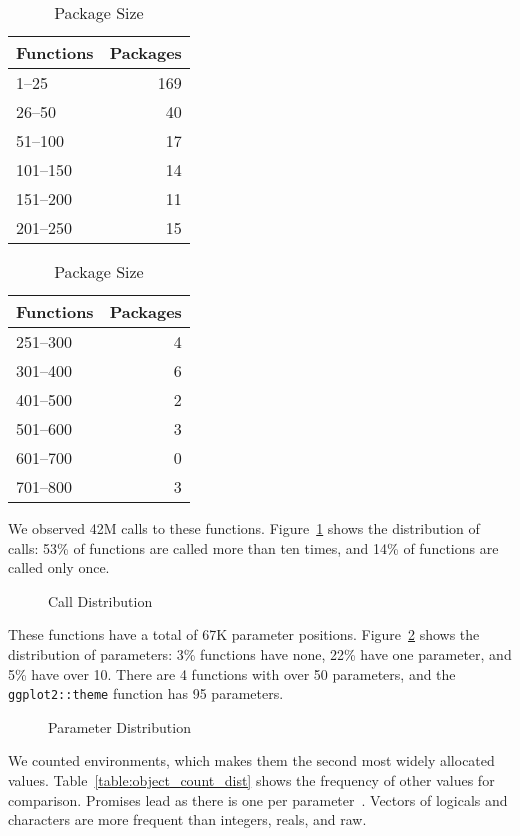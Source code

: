 \documentclass[10pt,sigplan,authorversion=true]{acmart}
\begin{document}
\begin{table}[!h]    \small
  \caption{Package Size} \label{table:packsize}  \centering
  \begin{tabular}{lr}    \toprule
    \bf Functions&\bf Packages\\    \midrule
    1--25&169\\
    26--50&40\\
    51--100&17\\
    101--150&14\\
    151--200&11\\
    201--250&15\\    \bottomrule
  \end{tabular}
  \quad
  \begin{tabular}{lr}    \toprule
    \bf Functions&\bf Packages\\    \midrule
    251--300&4\\
    301--400&6\\
    401--500&2\\
    501--600&3\\
    601--700&0\\
    701--800&3\\    \bottomrule
  \end{tabular}
\end{table}

\noindent
We observed 42M calls to these functions. Figure~\ref{fig:calldist} shows the
distribution of calls: 53\% of functions are called more than ten times, and 14\% of
functions are called only once.

\begin{figure}[!h]
  \centering
  
  \caption{Call Distribution}
  \label{fig:calldist}
\end{figure}

\noindent
These functions have a total of 67K parameter positions.
Figure~\ref{fig:paramdist} shows the distribution of parameters: 3\% functions
have none, 22\% have one parameter, and 5\% have over 10. There are 4 functions
with over 50 parameters, and the \texttt{ggplot2::theme} function has 95
parameters.

\begin{figure}[!h]  \centering
  
  \caption{Parameter Distribution}
  \label{fig:paramdist}
\end{figure}

We counted \ObjCntEnvironment environments, which makes them the second most
widely allocated values. Table~\ref{table:object_count_dist} shows the frequency
of other values for comparison. Promises lead as there is one per
parameter~\cite{oopsla19b}. Vectors of logicals and characters are more frequent
than integers, reals, and raw.
\end{document}
